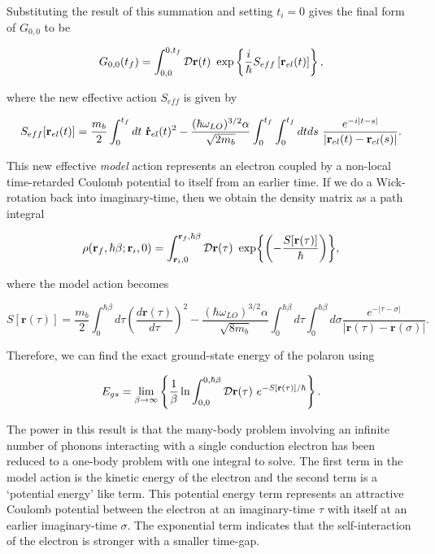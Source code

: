 Substituting the result of this summation and setting $t_i = 0$  gives the final form of $G_{0,0}$ to be

\begin{equation}
    G_{0,0}(t_f) = \int^{0, t_f}_{0, 0} \mathcal{D}\vb{r}(t)\ \exp\left\{ \frac{i}{\hbar} S_{eff} \left[\vb{r}_{el}(t)\right] \right\},
\end{equation}

where the new effective action $S_{eff}$ is given by

\begin{equation}
     S_{eff}[\vb{r}_{el}(t)] = \frac{m_b}{2} \int^{t_f}_{0} dt\ \vb{\dot{r}}_{el}(t)^2 -\frac{ (\hbar \omega_{LO})^{3/2} \alpha}{\sqrt{2 m_b}} \int_{0}^{t_f} \int_{0}^{t_f} dt ds\ \frac{e^{-i\abs{t-s}}}{\abs{\vb{r}_{el}(t) - \vb{r}_{el}(s)}}.
\end{equation}

This new effective \emph{model} action represents an electron coupled by a non-local time-retarded Coulomb potential to itself from an earlier time. If we do a Wick-rotation back into imaginary-time, then we obtain the density matrix as a path integral

\begin{equation}
    \rho(\vb{r}_{f}, \hbar\beta; \vb{r}_{i}, 0) = \int_{\vb{r}_i, 0}^{\vb{r}_f, \hbar\beta} \mathcal{D} \vb{r}(\tau)\ \exp{\left(-\frac{S[\mathbf{r}(\tau)]}{\hbar}\right)},
\label{eqn:path_density}
\end{equation}

where the model action becomes

\begin{equation}
    S[\mathbf{r}(\tau)] = \frac{m_b}{2}\int^{\hbar\beta}_0 d\tau \left(\frac{d\mathbf{r}(\tau)}{d\tau}\right)^2 - \frac{ (\hbar \omega_{LO})^{3/2} \alpha}{\sqrt{8 m_b}} \int^{\hbar\beta}_0 d\tau \int^{\hbar\beta}_0 d\sigma \frac{e^{-|\tau - \sigma|}}{|\mathbf{r}(\tau) - \mathbf{r}(\sigma)|} .
\label{eqn:athermal_model_action}
\end{equation}

Therefore, we can find the exact ground-state energy of the polaron using

\begin{equation}
    E_{gs} = \lim_{\beta \to \infty} \left\{ \frac{1}{\beta} \ln \int_{0, 0}^{0, \hbar\beta} \mathcal{D}\vb{r}(\tau)\ e^{-S[\vb{r}(\tau)]/\hbar} \right\}.
\end{equation}

The power in this result is that the many-body problem involving an infinite number of phonons interacting with a single conduction electron has been reduced to a one-body problem with one integral to solve. The first term in the model action is the kinetic energy of the electron and the second term is a `potential energy' like term. This potential energy term represents an attractive Coulomb potential between the electron at an imaginary-time $\tau$ with itself at an earlier imaginary-time $\sigma$. The exponential term indicates that the self-interaction of the electron is stronger with a smaller time-gap.

